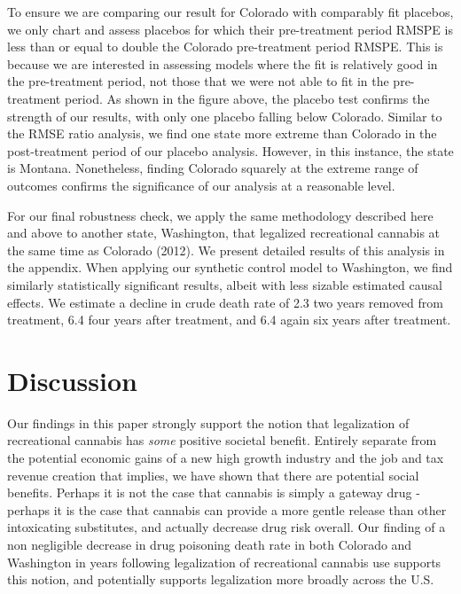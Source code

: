 \documentclass{article}
\begin{document}
To ensure we are comparing our result for Colorado with comparably fit placebos, we only chart and assess placebos for which their pre-treatment period RMSPE is less than or equal to double the Colorado pre-treatment period RMSPE. This is because we are interested in assessing models where the fit is relatively good in the pre-treatment period, not those that we were not able to fit in the pre-treatment period. As shown in the figure above, the placebo test confirms the strength of our results, with only one placebo falling below Colorado. Similar to the RMSE ratio analysis, we find one state more extreme than Colorado in the post-treatment period of our placebo analysis. However, in this instance, the state is Montana. Nonetheless, finding Colorado squarely at the extreme range of outcomes confirms the significance of our analysis at a reasonable level.

For our final robustness check, we apply the same methodology described here and above to another state, Washington, that legalized recreational cannabis at the same time as Colorado (2012). We present detailed results of this analysis in the appendix. When applying our synthetic control model to Washington, we find similarly statistically significant results, albeit with less sizable estimated causal effects. We estimate a decline in crude death rate of 2.3 two years removed from treatment, 6.4 four years after treatment, and 6.4 again six years after treatment. 

\section{Discussion}

Our findings in this paper strongly support the notion that legalization of recreational cannabis has \emph{some} positive societal benefit. Entirely separate from the potential economic gains of a new high growth industry and the job and tax revenue creation that implies, we have shown that there are potential social benefits. Perhaps it is not the case that cannabis is simply a gateway drug - perhaps it is the case that cannabis can provide a more gentle release than other intoxicating substitutes, and actually decrease drug risk overall. Our finding of a non negligible decrease in drug poisoning death rate in both Colorado and Washington in years following legalization of recreational cannabis use supports this notion, and potentially supports legalization more broadly across the U.S.
\end{document}

